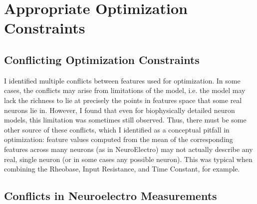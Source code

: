 \section{Appropriate Optimization Constraints}
\subsection{Conflicting Optimization Constraints}
I identified multiple conflicts between features used for optimization.
In some cases, the conflicts may arise from limitations of the model, i.e. the model may lack the richness to lie at precisely the points in features space that some real neurons lie in.
However, I found that even for biophysically detailed neuron models, this limitation was sometimes still observed.
Thus, there must be some other source of these conflicts, which I identified as a conceptual pitfall in optimization: feature values computed from the mean of the corresponding features across many neurons (as in NeuroElectro) may not actually describe any real, single neuron (or in some cases any possible neuron). 
This was typical when combining the Rheobase, Input Resistance, and Time Constant, for example.

\subsection{Conflicts in Neuroelectro Measurements}
% 






